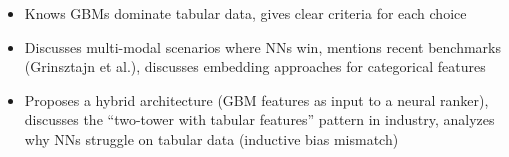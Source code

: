 \begin{interviewq}
\goodgreat
\begin{itemize}
    \item {} Knows GBMs dominate tabular data, gives clear criteria for each choice
    \item {} Discusses multi-modal scenarios where NNs win, mentions recent benchmarks (Grinsztajn et al.), discusses embedding approaches for categorical features
    \item {} Proposes a hybrid architecture (GBM features as input to a neural ranker), discusses the ``two-tower with tabular features'' pattern in industry, analyzes why NNs struggle on tabular data (inductive bias mismatch)
\end{itemize}

\end{interviewq}